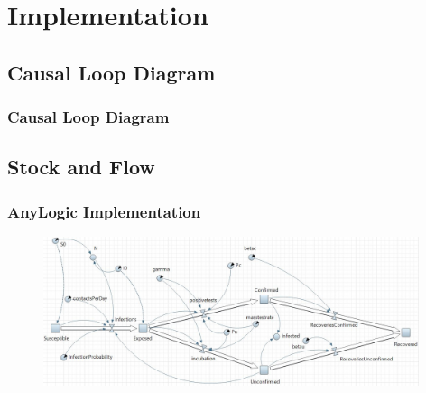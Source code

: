 \documentclass{beamer}
\begin{document}

\section{Implementation}
\subsection{Causal Loop Diagram}
\begin{frame}
\frametitle{Causal Loop Diagram}
  

\end{frame}


\subsection{Stock and Flow}
\begin{frame}
\frametitle{AnyLogic Implementation}

\begin{figure}[h!]
\includegraphics[width=110mm, scale = 0.5]{AnyLogicSIR}
\end{figure}
\end{frame}




%
%
%
%
\end{document}
